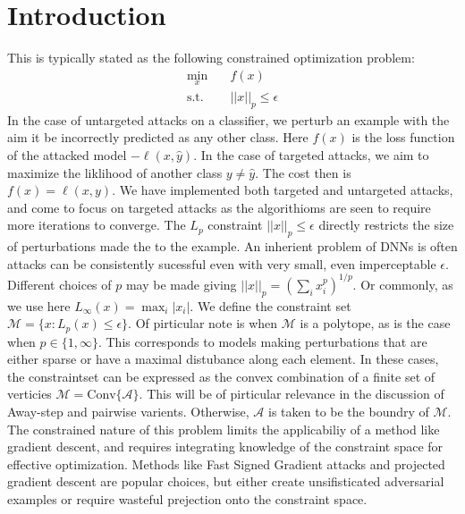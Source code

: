 \documentclass{article}
\begin{document}
\section{Introduction}
This is typically stated as the following constrained optimization problem:
\begin{equation}
\begin{aligned}
\min_x \quad & f(x)\\
\text{s.t.} \quad & ||x||_p \leq \epsilon
\end{aligned}
\end{equation}
In the case of untargeted attacks on a classifier, we perturb an example with the aim it be incorrectly predicted as any other class. Here $f(x)$ is the loss function of the attacked model $-\ell(x, \hat{y})$. In the case of targeted attacks, we aim to maximize the liklihood of another class $y \neq \hat{y}$. The cost then is $f(x) = \ell(x, y)$. We have implemented both targeted and untargeted attacks, and come to focus on targeted attacks as the algorithioms are seen to require more iterations to converge. 
The $L_p$ constraint $||x||_p \leq \epsilon$ directly restricts the size of perturbations made the to the example. An inherient problem of DNNs is often attacks can be consistently sucessful even with very small, even imperceptable $\epsilon$. Different choices of $p$ may be made giving $||x||_p = (\sum_i{x_i^p})^{1/p}$. Or commonly, as we use here $L_\infty(x) = \max_i |x_i|$. 
We define the constraint set $\mathcal{M} = \{x : L_p(x) \leq \epsilon\}$. 
Of pirticular note is when $\mathcal{M}$ is a polytope, as is the case when $p \in \{1, \infty\}$. This corresponds to models making perturbations that are either sparse or have a maximal distubance along each element. In these cases, the constraintset can be expressed as the convex combination of a finite set of verticies $\mathcal{M} = \text{Conv}\{\mathcal{A}\}$. This will be of pirticular relevance in the discussion of Away-step and pairwise varients. Otherwise, $\mathcal{A}$ is taken to be the boundry of $\mathcal{M}$.\break
The constrained nature of this problem limits the applicabiliy of a method like gradient descent, and requires integrating knowledge of the constraint space for effective optimization. Methods like Fast Signed Gradient attacks and projected gradient descent are popular choices, but either create unsifisticated adversarial examples or require wasteful prejection onto the constraint space. 
\end{document}
